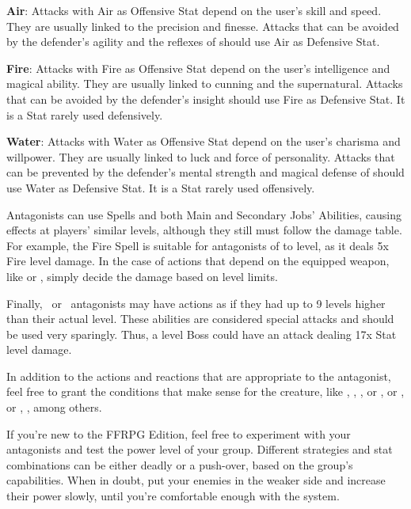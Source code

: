 \begin{multicols}{2}
\textbf{Air}: Attacks with Air as Offensive Stat depend on the user’s skill and speed. They are usually linked to the precision and finesse. Attacks that can be avoided by the defender’s agility and the reflexes of should use Air as Defensive Stat.

\textbf{Fire}: Attacks with Fire as Offensive Stat depend on the user’s intelligence and magical ability. They are usually linked to cunning and the supernatural. Attacks that can be avoided by the defender’s insight should use Fire as Defensive Stat. It is a Stat rarely used defensively.

\textbf{Water}: Attacks with Water as Offensive Stat depend on the user’s charisma and willpower. They are usually linked to luck and force of personality. Attacks that can be prevented by the defender’s mental strength and magical defense of should use Water as Defensive Stat. It is a Stat rarely used offensively.

Antagonists can use Spells and both Main and Secondary Jobs’ Abilities, causing effects at players’ similar levels, although they still must follow the damage table. For example, the Fire Spell is suitable for antagonists of  to  level, as it deals 5x Fire level damage. In the case of actions that depend on the equipped weapon, like  or , simply decide the damage based on level limits.

Finally, \tmobleet{}\ or \tmobboss{}\ antagonists may have actions as if they had up to 9 levels higher than their actual level. These abilities are considered special attacks and should be used very sparingly. Thus, a  level Boss could have an attack dealing 17x Stat level damage.

In addition to the actions and reactions that are appropriate to the antagonist, feel free to grant the conditions that make sense for the creature, like , , ,  or ,  or ,  or , , among others.

If you’re new to the FFRPG  Edition, feel free to experiment with your antagonists and test the power level of your group. Different strategies and stat combinations can be either deadly or a push-over, based on the group’s capabilities. When in doubt, put your enemies in the weaker side and increase their power slowly, until you’re comfortable enough with the system.


\end{multicols}
